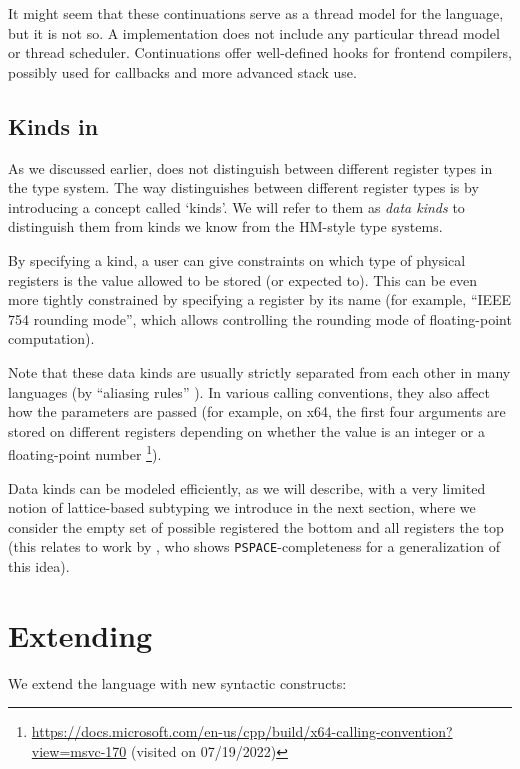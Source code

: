 It might seem that these continuations serve as a thread model for the language, but it is not so. A \cmm implementation does not include any particular thread model or thread scheduler. Continuations offer well-defined hooks for frontend compilers, possibly used for callbacks and more advanced stack use. \cite{ramsey2005c}

\subsection{Kinds in \cmm}

As we discussed earlier, \cmm does not distinguish between different register types in the type system. The way \cmm distinguishes between different register types is by introducing a concept called `kinds'. We will refer to them as \emph{data kinds} to distinguish them from kinds we know from the HM-style type systems.

By specifying a kind, a user can give constraints on which type of physical registers is the value allowed to be stored (or expected to). This can be even more tightly constrained by specifying a register by its name (for example, ``IEEE 754 rounding mode'', which allows controlling the rounding mode of floating-point computation).

Note that these data kinds are usually strictly separated from each other in many languages (by ``aliasing rules'' \cite{cstandard2018}). In various calling conventions, they also affect how the parameters are passed (for example, on x64, the first four arguments are stored on different registers depending on whether the value is an integer or a floating-point number \footnote{\url{https://docs.microsoft.com/en-us/cpp/build/x64-calling-convention?view=msvc-170} (visited on
07/19/2022)}).

Data kinds can be modeled efficiently, as we will describe, with a very limited notion of lattice-based subtyping we introduce in the next section, where we consider the empty set of possible registered the bottom and all registers the top (this relates to work by \citet{tiuryn1999subtyping}, who shows \texttt{PSPACE}-completeness for a generalization of this idea).

\section{Extending \cmm}
\label{sec:extension}

We extend the language with new syntactic constructs:


